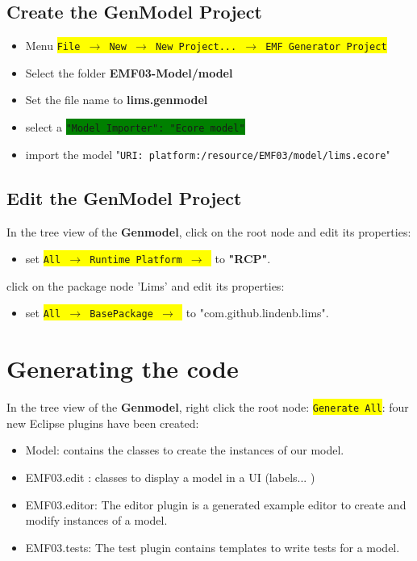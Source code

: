 \documentclass{article}
\newcommand{\menu}[1]{\colorbox{yellow}{\texttt{#1}}}
\newcommand{\wizard}[1]{\colorbox{green}{\texttt{#1}}}
\begin{document}
\subsection{Create the GenModel Project}
\begin{itemize}
\item Menu \menu{File $\rightarrow$  New  $\rightarrow$ New Project... $\rightarrow$ EMF Generator Project}
\item Select the folder \textbf{EMF03-Model/model}
\item Set the file name to \textbf{lims.genmodel}
\item select a \wizard{"Model Importer": "Ecore model"}
\item import the model "\texttt{URI: platform:/resource/EMF03/model/lims.ecore}"
\end{itemize}

\subsection{Edit the GenModel Project}
In the tree view of the \textbf{Genmodel}, click on the root node and edit its properties:
\begin{itemize}
\item set \menu{All $\rightarrow$  Runtime Platform  $\rightarrow$ } to  \textbf{"RCP"}.
\end{itemize}

 click on the package node 'Lims' and edit its properties:
\begin{itemize}
\item set \menu{All $\rightarrow$  BasePackage  $\rightarrow$ } to  "com.github.lindenb.lims".
\end{itemize}




\section{Generating the code}
In the tree view of the \textbf{Genmodel}, right click the root node: \menu{Generate All}: four new Eclipse plugins have been created:
\begin{itemize}
\item{Model}: contains the classes to create the instances of our model.
\item{EMF03.edit} : classes to display a model in a UI (labels... )
\item{EMF03.editor}: The editor plugin is a generated example editor to create and modify instances of a model.
\item{EMF03.tests}: The test plugin contains templates to write tests for a model.
\end{itemize}
\end{document}
